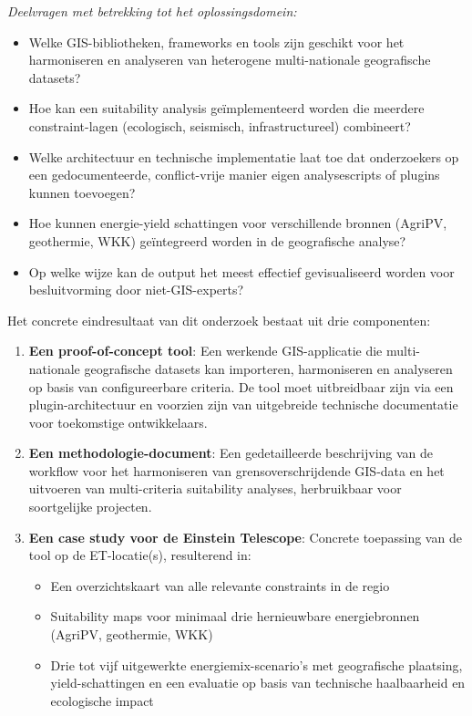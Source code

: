 \textit{Deelvragen met betrekking tot het oplossingsdomein:}
\begin{itemize}
    \item Welke GIS-bibliotheken, frameworks en tools zijn geschikt voor het harmoniseren en analyseren van heterogene multi-nationale geografische datasets?
    \item Hoe kan een suitability analysis geïmplementeerd worden die meerdere constraint-lagen (ecologisch, seismisch, infrastructureel) combineert?
    \item Welke architectuur en technische implementatie laat toe dat onderzoekers op een gedocumenteerde, conflict-vrije manier eigen analysescripts of plugins kunnen toevoegen?
    \item Hoe kunnen energie-yield schattingen voor verschillende bronnen (AgriPV, geothermie, WKK) geïntegreerd worden in de geografische analyse?
    \item Op welke wijze kan de output het meest effectief gevisualiseerd worden voor besluitvorming door niet-GIS-experts?
\end{itemize}

Het concrete eindresultaat van dit onderzoek bestaat uit drie componenten:

\begin{enumerate}
    \item \textbf{Een proof-of-concept tool}: Een werkende GIS-applicatie die multi-nationale geografische datasets kan importeren, harmoniseren en analyseren op basis van configureerbare criteria. De tool moet uitbreidbaar zijn via een plugin-architectuur en voorzien zijn van uitgebreide technische documentatie voor toekomstige ontwikkelaars.
    
    \item \textbf{Een methodologie-document}: Een gedetailleerde beschrijving van de workflow voor het harmoniseren van grensoverschrijdende GIS-data en het uitvoeren van multi-criteria suitability analyses, herbruikbaar voor soortgelijke projecten.
    
    \item \textbf{Een case study voor de Einstein Telescope}: Concrete toepassing van de tool op de ET-locatie(s), resulterend in:
    \begin{itemize}
        \item Een overzichtskaart van alle relevante constraints in de regio
        \item Suitability maps voor minimaal drie hernieuwbare energiebronnen (AgriPV, geothermie, WKK)
        \item Drie tot vijf uitgewerkte energiemix-scenario's met geografische plaatsing, yield-schattingen en een evaluatie op basis van technische haalbaarheid en ecologische impact
    \end{itemize}
\end{enumerate}

